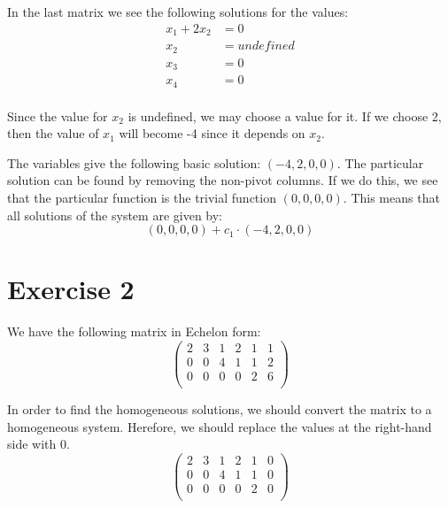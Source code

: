 \documentclass[a4paper]{article}
\begin{document}
In the last matrix we see the following solutions for the values:
\begin{align*}
  x_1 + 2x_2 &= 0 \\
  x_2 &= undefined \\
  x_3 &= 0 \\
  x_4 &= 0 \\
\end{align*}

Since the value for $x_2$ is undefined, we may choose a value for it. If we choose 2, then the value of $x_1$ will become -4 since it depends on $x_2$.

The variables give the following basic solution: $(-4, 2, 0, 0)$. The particular solution can be found by removing the non-pivot columns. If we do this, we see that the particular function is the trivial function $(0, 0, 0, 0)$. This means that all solutions of the system are given by:
\[
(0, 0, 0, 0) + c_1 \cdot (-4, 2, 0, 0)
\]

\section*{Exercise 2}
We have the following matrix in Echelon form: \\
\[
\left(
\begin{array}{ccccc|c}
2 & 3 & 1 & 2 & 1 & 1   \\
0 & 0 & 4 & 1 & 1 & 2  \\
0 & 0 & 0 & 0 & 2 & 6 \\
\end{array}
\right)
\]

In order to find the homogeneous solutions, we should convert the matrix to a homogeneous system. Herefore, we should replace the values at the right-hand side with 0.
\[
\left(
\begin{array}{ccccc|c}
2 & 3 & 1 & 2 & 1 & 0   \\
0 & 0 & 4 & 1 & 1 & 0  \\
0 & 0 & 0 & 0 & 2 & 0 \\
\end{array}
\right)
\]
\end{document}
